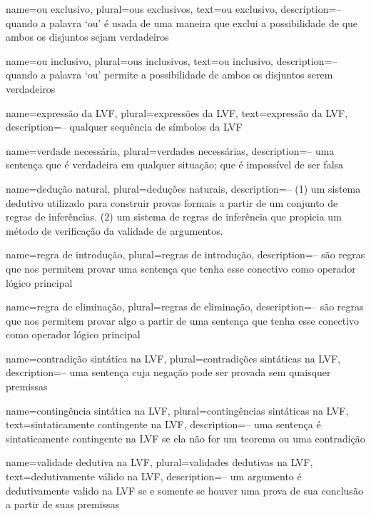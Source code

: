 {
 name=ou exclusivo,
 plural=ous exclusivos,
 text=ou exclusivo,
 description={-- quando a palavra `ou' é usada de uma maneira que exclui a
possibilidade de que ambos os disjuntos sejam verdadeiros}
}

{
 name=ou inclusivo,
 plural=ous inclusivos,
 text=ou inclusivo,
 description={-- quando a palavra `ou' permite a possibilidade de ambos os disjuntos
serem verdadeiros}
}

{
 name=expressão da LVF,
 plural=expressões da LVF,
 text=expressão da LVF,
 description={-- qualquer sequência de símbolos da LVF}
}

{
 name={verdade necessária},
 plural={verdades necessárias},
 description={-- uma sentença que é verdadeira em qualquer situação; que é impossível de ser falsa}
}

{
 name={dedução natural},
 plural={deduções naturais},
 description={-- (1) um sistema dedutivo utilizado para construir provas formais a partir de um conjunto de regras de inferências. (2) um sistema de regras de inferência que propicia um método de verificação da validade de argumentos.}
}

{
 name={regra de introdução},
 plural={regras de introdução},
 description={-- são regras que nos permitem provar uma sentença que tenha esse conectivo como operador lógico principal}
}

{
 name={regra de eliminação},
 plural={regras de eliminação},
 description={-- são regras que nos permitem provar algo a partir de uma
sentença que tenha esse conectivo como operador lógico principal}
}

{
 name={contradição sintática na LVF},
 plural={contradições sintáticas na LVF},
 description={-- uma sentença cuja negação pode ser provada sem quaisquer premissas}
}

{
 name={contingência sintática na LVF},
 plural={contingências sintáticas na LVF},
 text={sintaticamente contingente na LVF},
 description={-- uma sentença é sintaticamente contingente na LVF se ela não for um teorema ou uma contradição}
}

{
 name={validade dedutiva na LVF},
 plural={validades dedutivas na LVF},
 text={dedutivamente válido na LVF},
 description={-- um argumento é dedutivamente valido na LVF se e
somente se houver uma prova de sua conclusão a partir de suas premissas}
}

